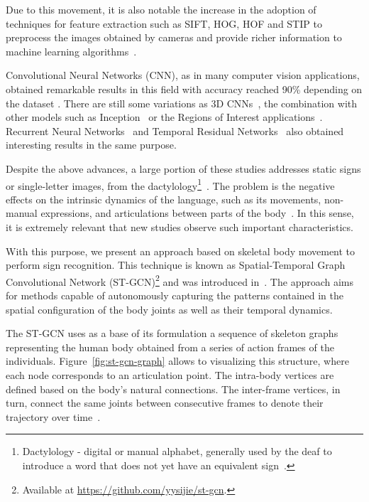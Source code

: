 Due to this movement, it is also notable the increase in the adoption of techniques for feature extraction such as SIFT, HOG, HOF and STIP to preprocess the images obtained by cameras and provide richer information to machine learning algorithms~\cite{laptev-2008,lim-2016,shanta-2018}.

Convolutional Neural Networks (CNN), as in many computer vision applications, obtained remarkable results in this field with accuracy reached 90\% depending on the dataset \cite{shanta-2018,taskiran-2018,rao-2018}. There are still some variations as 3D CNNs~\cite{elbadawy-2017}, the combination with other models such as Inception~\cite{das-2018} or the Regions of Interest applications~\cite{sajanraj-2018}. Recurrent Neural Networks~\cite{konstantinidis-2018} and Temporal Residual Networks~\cite{pigou-2017} also obtained interesting results in the same purpose.

Despite the above advances, a large portion of these studies addresses static signs or single-letter images, from the dactylology\footnote{Dactylology - digital or manual alphabet, generally used by the deaf to introduce a word that does not yet have an equivalent sign~\cite{pereira-choi-2011}.
}~\cite{taskiran-2018,elbadawy-2017,das-2018}. The problem is the negative effects on the intrinsic dynamics of the language, such as its movements, non-manual expressions, and articulations between parts of the body~\cite{quadros-2004}. In this sense, it is extremely relevant that new studies observe such important characteristics.

With this purpose, we present an approach based on skeletal body movement to perform sign recognition. This technique is known as Spatial-Temporal Graph Convolutional Network (ST-GCN)\footnote {Available at \url{https://github.com/yysijie/st-gcn}.} and was introduced in~\cite{st-gcn-2018}. The approach aims for methods capable of autonomously capturing the patterns contained in the spatial configuration of the body joints as well as their temporal dynamics. %

The ST-GCN uses as a base of its formulation a sequence of skeleton graphs representing the human body obtained from a series of action frames of the individuals. Figure~\ref{fig:st-gcn-graph} allows to visualizing this structure, where each node corresponds to an articulation point. The intra-body vertices are defined based on the body's natural connections. The inter-frame vertices, in turn, connect the same joints between consecutive frames to denote their trajectory over time~\cite{st-gcn-2018}. \\[-8mm]
    

